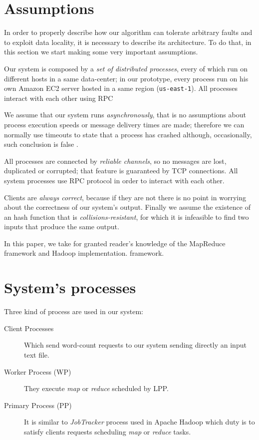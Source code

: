 \documentclass[sigchi]{acmart}
\begin{document}
\section{Assumptions}

In order to properly describe how our algorithm can tolerate arbitrary faults and to exploit data locality, it is necessary to describe its architecture. To do that, in this section we start making some very important assumptions.

Our system is composed by a \textit{set of distributed processes}, every of which run on different hosts in a same data-center; in our prototype, every process run on his own Amazon EC2 server hosted in a same region (\texttt{us-east-1}). All processes interact with each other using RPC

We assume that our system runs \textit{asynchronously}, that is no assumptions about process execution speeds or message delivery times are made; therefore we can normally use timeouts to state that a process has crashed although, occasionally, such conclusion is false \cite{SDCC}.

All processes are connected by \textit{reliable channels}, so no messages are lost, duplicated or corrupted; that feature is guaranteed by TCP connections. All system processes use RPC protocol in order to interact with each other.

Clients are \textit{always correct}, because if they are not there is no point in worrying about the correctness of our system's output. Finally we assume the existence of an hash function that is \textit{collisions-resistant}, for which it is infeasible to find two inputs that produce the same output.

In this paper, we take for granted reader's knowledge of the MapReduce framework and Hadoop implementation. framework.

\section{System's processes}

Three kind of process are used in our system:

\begin{description}
\item[Client Processes] Which send word-count requests to our system sending directly an input text file. 

\item[Worker Process (WP)] They execute \textit{map} or \textit{reduce} scheduled by LPP.

\item[Primary Process (PP)] It is similar to \textit{JobTracker} process used in Apache Hadoop which duty is to satisfy clients requests scheduling \textit{map} or \textit{reduce} tasks. 
\end{description}
\end{document}
